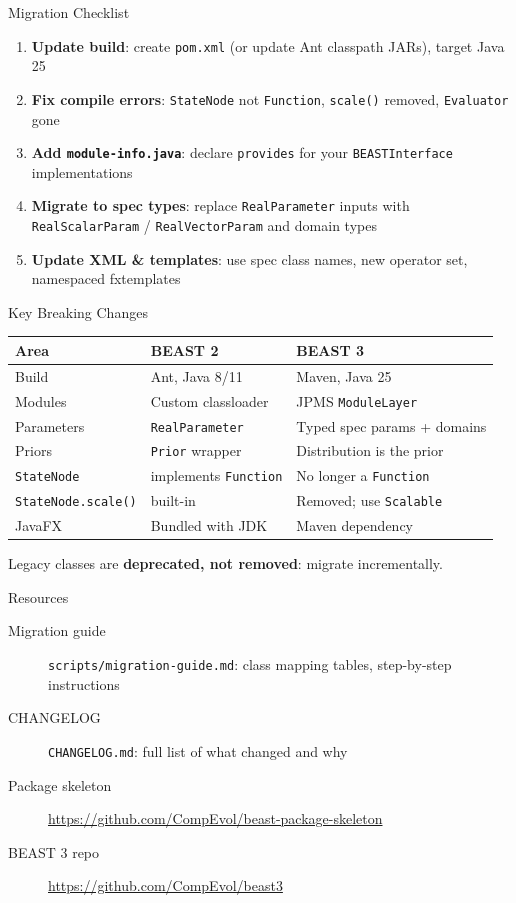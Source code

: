\documentclass[aspectratio=169,11pt]{beamer}
\newcommand{\code}[1]{\texttt{#1}}
\begin{document}
\begin{frame}{Migration Checklist}
\begin{enumerate}
\item \textbf{Update build}: create \code{pom.xml} (or update Ant classpath JARs), target Java 25
\item \textbf{Fix compile errors}: \code{StateNode} not \code{Function}, \code{scale()} removed, \code{Evaluator} gone
\item \textbf{Add \code{module-info.java}}: declare \code{provides} for your \code{BEASTInterface} implementations
\item \textbf{Migrate to spec types}: replace \code{RealParameter} inputs with \code{RealScalarParam} / \code{RealVectorParam} and domain types
\item \textbf{Update XML \& templates}: use spec class names, new operator set, namespaced fxtemplates
\end{enumerate}
\end{frame}

\begin{frame}{Key Breaking Changes}
\begin{center}
\begin{tabular}{lll}
\toprule
\textbf{Area} & \textbf{BEAST 2} & \textbf{BEAST 3} \\
\midrule
Build & Ant, Java 8/11 & Maven, Java 25 \\
Modules & Custom classloader & JPMS \code{ModuleLayer} \\
Parameters & \code{RealParameter} & Typed spec params + domains \\
Priors & \code{Prior} wrapper & Distribution is the prior \\
\code{StateNode} & implements \code{Function} & No longer a \code{Function} \\
\code{StateNode.scale()} & built-in & Removed; use \code{Scalable} \\
JavaFX & Bundled with JDK & Maven dependency \\
\bottomrule
\end{tabular}
\end{center}

\vspace{0.5em}
Legacy classes are \textbf{deprecated, not removed}: migrate incrementally.
\end{frame}



\begin{frame}{Resources}
\begin{description}
\item[Migration guide] \code{scripts/migration-guide.md}: class mapping tables, step-by-step instructions
\item[CHANGELOG] \code{CHANGELOG.md}: full list of what changed and why
\item[Package skeleton] \url{https://github.com/CompEvol/beast-package-skeleton}
\item[BEAST 3 repo] \url{https://github.com/CompEvol/beast3}
\end{description}
\end{frame}
\end{document}
